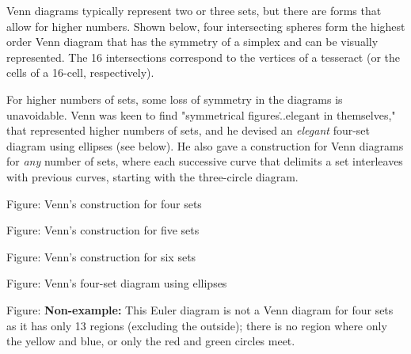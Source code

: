Venn diagrams typically represent two or three sets, but there are forms that allow for
higher numbers. Shown below, four intersecting spheres form the highest order Venn diagram
that has the symmetry of a simplex and can be visually represented. The 16 intersections
correspond to the vertices of a tesseract (or the cells of a 16-cell, respectively).














For higher numbers of sets, some loss of symmetry in the diagrams is unavoidable. Venn was
keen to find "symmetrical figures\...elegant in themselves," that represented higher
numbers of sets, and he devised an \textit{elegant} four-set diagram using ellipses (see
below). He also gave a construction for Venn diagrams for \textit{any} number of sets,
where each successive curve that delimits a set interleaves with previous curves, starting
with the three-circle diagram.






Figure: Venn's construction for four sets






Figure: Venn's construction for five sets






Figure: Venn's construction for six sets






Figure: Venn's four-set diagram using ellipses






Figure: \textbf{Non-example:} This Euler diagram is not a Venn diagram for four sets as it
has only 13 regions (excluding the outside); there is no region where only the yellow and
blue, or only the red and green circles meet.




